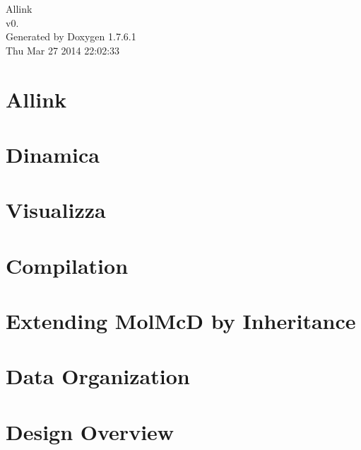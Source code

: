 \documentclass[letterpaper]{article}
\begin{document}
\hypersetup{pageanchor=false,citecolor=blue}
\begin{titlepage}
\vspace*{7cm}
\begin{center}
{\Large \-Allink \\[1ex]\large v0. }\\
\vspace*{1cm}
{\large \-Generated by Doxygen 1.7.6.1}\\
\vspace*{0.5cm}
{\small Thu Mar 27 2014 22:02:33}\\
\end{center}
\end{titlepage}
\tableofcontents
{}
\hypersetup{pageanchor=true,citecolor=blue}
\section{\-Allink}
\label{index}\hypertarget{index}{}
\section{\-Dinamica}
\label{Dinamica_page}
\hypertarget{Dinamica_page}{}

\section{\-Visualizza}
\label{Visualizza_page}
\hypertarget{Visualizza_page}{}

\section{\-Compilation}
\label{compile_page}
\hypertarget{compile_page}{}

\section{\-Extending \-Mol\-Mc\-D by \-Inheritance}
\label{extension_page}
\hypertarget{extension_page}{}

\section{\-Data \-Organization}
\label{data_page}
\hypertarget{data_page}{}

\section{\-Design \-Overview}
\label{design_page}
\hypertarget{design_page}{}

\end{document}
